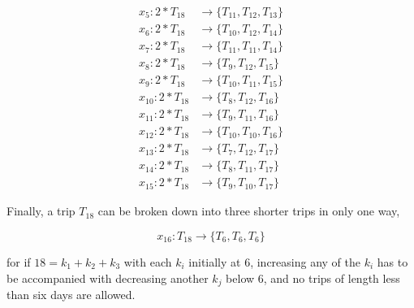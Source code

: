 \documentclass[10pt,twocolumn]{article}
\begin{document}
\begin{align}
x_5: 2 * T_{18} &\rightarrow \{T_{11}, T_{12}, T_{13}\} \nonumber\\
x_6: 2 * T_{18} &\rightarrow \{T_{10}, T_{12}, T_{14}\} \nonumber\\
x_7: 2 * T_{18} &\rightarrow \{T_{11}, T_{11}, T_{14}\} \nonumber\\
x_8: 2 * T_{18} &\rightarrow \{T_{9}, T_{12}, T_{15}\} \nonumber\\
x_9: 2 * T_{18} &\rightarrow \{T_{10}, T_{11}, T_{15}\} \nonumber\\
x_{10}: 2 * T_{18} &\rightarrow \{T_{8}, T_{12}, T_{16}\} \nonumber\\
x_{11}: 2 * T_{18} &\rightarrow \{T_{9}, T_{11}, T_{16}\} \nonumber\\
x_{12}: 2 * T_{18} &\rightarrow \{T_{10}, T_{10}, T_{16}\} \nonumber\\
x_{13}: 2 * T_{18} &\rightarrow \{T_{7}, T_{12}, T_{17}\} \nonumber\\
x_{14}: 2 * T_{18} &\rightarrow \{T_{8}, T_{11}, T_{17}\} \nonumber\\
x_{15}: 2 * T_{18} &\rightarrow \{T_{9}, T_{10}, T_{17}\} \nonumber
\end{align}

Finally, a trip $T_{18}$ can be broken down into three shorter trips in only one way,

$$x_{16}: T_{18} \rightarrow \{T_6, T_6, T_6\}$$

for if $18 = k_1 + k_2 + k_3$ with each $k_i$ initially at $6$, increasing any of the $k_i$ has to be accompanied with decreasing another $k_j$ below $6$, and no trips of length less than six days are allowed.
\end{document}
